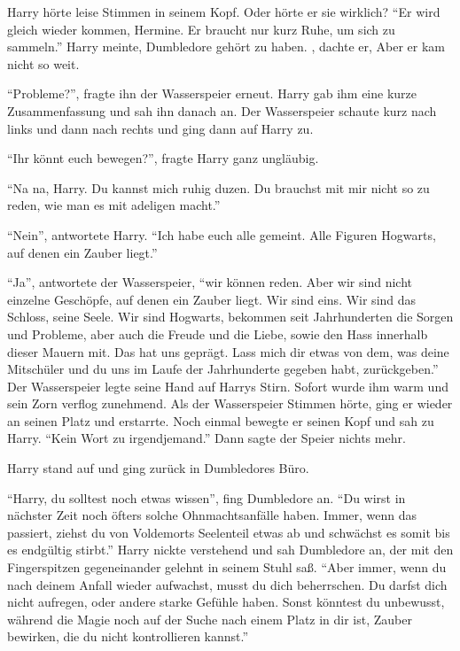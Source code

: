 Harry hörte leise Stimmen in seinem Kopf. Oder hörte er sie wirklich? \enquote{Er wird gleich wieder kommen, Hermine. Er braucht nur kurz Ruhe, um sich zu sammeln.} Harry meinte, Dumbledore gehört zu haben. , dachte er,  Aber er kam nicht so weit.

\enquote{Probleme?}, fragte ihn der Wasserspeier erneut. Harry gab ihm eine kurze Zusammenfassung und sah ihn danach an. Der Wasserspeier schaute kurz nach links und dann nach rechts und ging dann auf Harry zu.

\enquote{Ihr könnt euch bewegen?}, fragte Harry ganz ungläubig.

\enquote{Na na, Harry. Du kannst mich ruhig duzen. Du brauchst mit mir nicht so zu reden, wie man es mit adeligen macht.}

\enquote{Nein}, antwortete Harry. \enquote{Ich habe euch alle gemeint. Alle Figuren Hogwarts, auf denen ein Zauber liegt.}

\enquote{Ja}, antwortete der Wasserspeier, \enquote{wir können reden. Aber wir sind nicht einzelne Geschöpfe, auf denen ein Zauber liegt. Wir sind eins. Wir sind das Schloss, seine Seele. Wir sind Hogwarts, bekommen seit Jahrhunderten die Sorgen und Probleme, aber auch die Freude und die Liebe, sowie den Hass innerhalb dieser Mauern mit. Das hat uns geprägt. Lass mich dir etwas von dem, was deine Mitschüler und du uns im Laufe der Jahrhunderte gegeben habt, zurückgeben.} Der Wasserspeier legte seine Hand auf Harrys Stirn. Sofort wurde ihm warm und sein Zorn verflog zunehmend. Als der Wasserspeier Stimmen hörte, ging er wieder an seinen Platz und erstarrte. Noch einmal bewegte er seinen Kopf und sah zu Harry. \enquote{Kein Wort zu irgendjemand.} Dann sagte der Speier nichts mehr.

Harry stand auf und ging zurück in Dumbledores Büro.

\enquote{Harry, du solltest noch etwas wissen}, fing Dumbledore an. \enquote{Du wirst in nächster Zeit noch öfters solche Ohnmachtsanfälle haben. Immer, wenn das passiert, ziehst du von Voldemorts Seelenteil etwas ab und schwächst es somit bis es endgültig stirbt.} Harry nickte verstehend und sah Dumbledore an, der mit den Fingerspitzen gegeneinander gelehnt in seinem Stuhl saß. \enquote{Aber \gst immer, wenn du nach deinem Anfall wieder aufwachst, musst du dich beherrschen. Du darfst dich nicht aufregen, oder andere starke Gefühle haben. Sonst könntest du unbewusst, während die Magie noch auf der Suche nach einem Platz in dir ist, Zauber bewirken, die du nicht kontrollieren kannst.}

